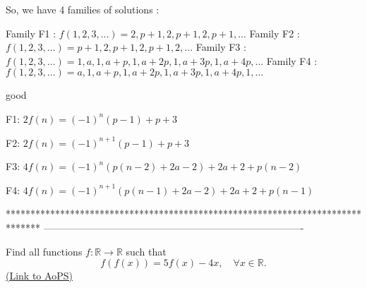 \begin{mysolution}
	\begin{tcolorbox}So, we have 4 families of solutions :

Family F1 : $f(1,2,3,...)=2,p+1,2,p+1,2,p+1, ...$
Family F2 : $f(1,2,3,...)=p+1,2,p+1,2,p+1,2, ...$
Family F3 : $f(1,2,3,...)=1,a,1,a+p,1,a+2p,1,a+3p,1,a+4p, ...$
Family F4 : $f(1,2,3,...)=a,1,a+p,1,a+2p,1,a+3p,1,a+4p,1, ...$\end{tcolorbox}
good   

F1: $2f(n)=(-1)^{n}(p-1)+p+3$

F2: ${2f(n)=(-1)^{n+1}(p-1)+p+3}$

F3: $4f(n)=(-1)^{n}(p(n-2)+2a-2)+2a+2+p(n-2)$

F4: $4f(n)=(-1)^{n+1}(p(n-1)+2a-2)+2a+2+p(n-1)$
\end{mysolution}
*******************************************************************************
-------------------------------------------------------------------------------

\begin{problem}
	Find all functions $f: \mathbb R\to \mathbb R$ such that
\[f(f(x))=5f(x)-4x, \quad \forall x \in \mathbb R.\]
	\flushright \href{https://artofproblemsolving.com/community/c6h153306}{(Link to AoPS)}
\end{problem}





